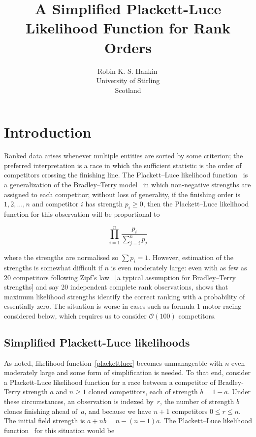 \documentclass[article]{ajs}
\author{Robin K. S. Hankin\,\orcidlink{0000-0001-5982-0415}\\
  University of Stirling\\ Scotland}
\title{A Simplified Plackett-Luce Likelihood Function for Rank Orders}
\begin{document}

\section{Introduction}

Ranked data arises whenever multiple entities are sorted by some
criterion; the preferred interpretation is a race in which the
sufficient statistic is the order of competitors crossing the
finishing line.  The Plackett--Luce likelihood
function~\citep{luce1959,plackett1975} is a generalization of the
Bradley--Terry model~\citep{bradley1952} in which non-negative
strengths are assigned to each competitor; without loss of generality,
if the finishing order is $1,2,\ldots,n$ and competitor $i$ has
strength $p_i\geqslant 0$, then the Plackett--Luce likelihood function
for this observation will be proportional to

\begin{equation}\label{plackettluce}
\prod_{i=1}^n\frac{p_i}{\sum_{j=i}^np_j}
\end{equation}

\noindent where the strengths are normalised so $\sum p_i=1$.
However, estimation of the strengths is somewhat difficult if $n$ is
even moderately large: even with as few as 20 competitors following
Zipf's law~\citep{zipf1949} [a typical assumption for Bradley--Terry
  strengths] and say 20 independent complete rank observations,
\cite{hankin2017_rmd} shows that maximum likelihood strengths
identify the correct ranking with a probability of essentially zero.
The situation is worse in cases such as formula 1 motor racing
considered below, which requires us to consider ${\mathcal O}(100)$
competitors.

\subsection{Simplified Plackett-Luce likelihoods}

As noted, likelihood function~\ref{plackettluce} becomes unmanageable
with $n$ even moderately large and some form of simplification is
needed.  To that end, consider a Plackett-Luce likelihood function for
a race between a competitor of Bradley-Terry strength $a$ and
$n\geqslant 1$ cloned competitors, each of strength $b=1-a$.  Under
these circumstances, an observation is indexed by~$r$, the number of
strength $b$ clones finishing ahead of~$a$, and because we have $n+1$
competitors $0\leqslant r\leqslant n$.  The initial field strength is
$a+nb=n-(n-1)a$.  The Plackett--Luce likelihood
function~\citep{luce1959,plackett1975} for this situation would be
\end{document}
